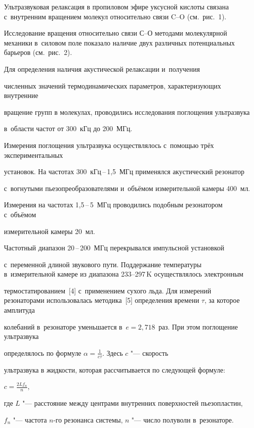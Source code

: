 Ультразвуковая релаксация в пропиловом эфире уксусной кислоты связана с~внутренним вращением молекул относительно связи C--O (см.~рис.~1). 

Исследование вращения относительно связи С--О методами молекулярной механики в~силовом поле  показало наличие двух различных потенциальных барьеров (см.~рис.~2).







Для определения наличия акустической релаксации и~получения 

численных значений термодинамических параметров, характеризующих внутренние 

вращение групп в молекулах, проводились исследования поглощения ультразвука 

в~области частот от 300~кГц до 200~МГц. 

Измерения поглощения ультразвука осуществлялось с~помощью трёх экспериментальных 

установок. На частотах 300~кГц\,--\,1{,}5~МГц применялся акустический резонатор 

с~вогнутыми пьезопреобразователями и~объёмом измерительной камеры 400~мл. 

Измерения на частотах 1{,}5\,--\,5~МГц проводились подобным резонатором с~объёмом 

измерительной камеры 20~мл. 

Частотный диапазон 20\,--\,200~МГц перекрывался импульсной установкой 

с~переменной длиной звукового пути. Поддержание температуры в~измерительной камере из диапазона 233--297\,K  осуществлялось электронным 

термостатированием~[4] с~применением сухого льда. Для измерений резонаторами использовалась методика~[5] определения времени $\tau $, за которое амплитуда 

колебаний в~резонаторе уменьшается в~$e=2,718$~раз. При этом поглощение ультразвука 

определялось по формуле $\alpha =\frac 1{c\tau }$. Здесь $c$ "--- скорость 

ультразвука в жидкости, которая рассчитывается по следующей формуле:

$ c=\frac{2Lf_n}n$,

где $L$ "--- расстояние между центрами внутренних поверхностей пьезопластин, 

$f_{n}$ "--- частота $n$-го резонанса системы, $n$ "--- число полуволн в~резонаторе. 









